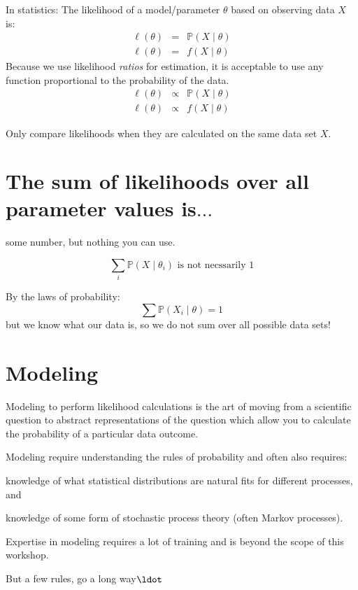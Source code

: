 \documentclass[landscape]{foils}
\renewcommand{\Pr}{\mathbb{P}}
\begin{document}
In statistics:
The likelihood of a model/parameter $\theta$ based on observing data $X$ is:
\begin{eqnarray*}
  \ell(\theta) & = & \Pr(X \mid \theta) \\
  \ell(\theta) & = & f(X \mid \theta)
\end{eqnarray*}
Because we use likelihood {\em ratios} for estimation, it is acceptable
to use any function proportional to the probability of the data.
\begin{eqnarray*}
  \ell(\theta) & \propto & \Pr(X \mid \theta) \\
  \ell(\theta) & \propto & f(X \mid \theta)
\end{eqnarray*}

Only compare likelihoods when they are calculated on the same data set $X$.

\myNewSlide
\section*{The sum of likelihoods over all parameter values is$\ldots$}
some number, but nothing you can use.

$$\sum_i \Pr(X \mid \theta_i) \mbox{ is not necssarily } 1$$


By the laws of probability:
$$\sum \Pr(X_i \mid \theta) = 1$$
but we know what our data is, so we do not sum over all possible data sets!

\myNewSlide
\section*{Modeling}
Modeling to perform likelihood calculations is the art of moving from a 
scientific question to abstract representations of the question which
allow you to calculate the probability of a particular data outcome.

Modeling require understanding the rules of probability and often also requires:
\begin{compactitem}
  \item knowledge of what statistical distributions are natural fits for different processes, and
  \item knowledge of some form of stochastic process theory (often Markov processes).
\end{compactitem}
Expertise in modeling requires a lot of training and is beyond the scope of this workshop.

But a few rules, go a long way$\ldot$

\myNewSlide
\end{document}
